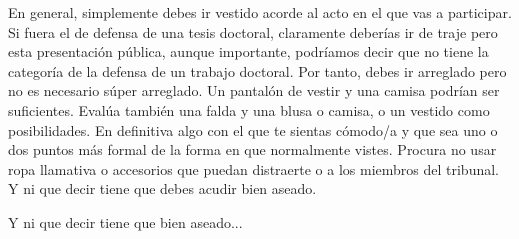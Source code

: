 En general, simplemente debes ir vestido acorde al acto en el que vas a participar. Si fuera el de defensa de una tesis doctoral, claramente deberías ir de traje pero esta presentación pública, aunque importante, podríamos decir que no tiene la categoría de la defensa de un trabajo doctoral. Por tanto, debes ir arreglado pero no es necesario súper arreglado. Un pantalón de vestir y una camisa podrían ser suficientes. Evalúa también una falda y una blusa o camisa, o un vestido como posibilidades. En definitiva algo con el que te sientas cómodo/a y que sea uno o dos puntos más formal de la forma en que normalmente vistes. Procura no usar ropa llamativa o accesorios que puedan distraerte o a los miembros del tribunal. Y ni que decir tiene que debes acudir bien aseado.

Y ni que decir tiene que bien aseado...





